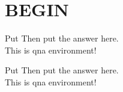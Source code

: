 \documentclass{spaexp}
\begin{document}
     
\maketitle
\section{BEGIN}

\begin{qna}{Put}
    Then put the answer here.\\
    This is qna environment!
\end{qna}
\begin{qna}{Put}
    Then put the answer here.\\
    This is qna environment!
\end{qna}
\end{document}
